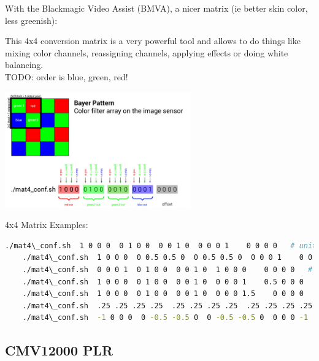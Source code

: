{With the Blackmagic Video Assist (BMVA), a nicer matrix (ie better skin color, less greenish): 


This 4x4 conversion matrix is a very powerful tool and allows to do things like mixing color channels, reassigning channels, applying effects or doing white balancing.\\

TODO: order is blue, green, red! 

\begin{center}
\includegraphics[height=5cm]{images/700px-Mat4-conf-illustration-01}
\end{center}

4x4 Matrix Examples:

\begin{lstlisting}[language=bash,morekeywords=$,keywordstyle=\bfseries,frame=none,xleftmargin=.25in,belowskip=2em, aboveskip=2em]
    ./mat4\_conf.sh  1 0 0 0  0 1 0 0  0 0 1 0  0 0 0 1    0 0 0 0   # unity matrix but not optimal as both green channels are processed separately
    ./mat4\_conf.sh  1 0 0 0  0 0.5 0.5 0  0 0.5 0.5 0  0 0 0 1    0 0 0 0   # the two green channels inside each 2x2 pixel block are averaged and output on both green pixels
    ./mat4\_conf.sh  0 0 0 1  0 1 0 0  0 0 1 0  1 0 0 0    0 0 0 0   # red and blue are swapped
    ./mat4\_conf.sh  1 0 0 0  0 1 0 0  0 0 1 0  0 0 0 1    0.5 0 0 0    # red 50% brigther
    ./mat4\_conf.sh  1 0 0 0  0 1 0 0  0 0 1 0  0 0 0 1.5    0 0 0 0    # blue multiplied with factor 1.5
    ./mat4\_conf.sh  .25 .25 .25 .25  .25 .25 .25 .25  .25 .25 .25 .25  .25 .25 .25 .25    0 0 0 0    # black/white
    ./mat4\_conf.sh  -1 0 0 0  0 -0.5 -0.5 0  0 -0.5 -0.5 0  0 0 0 -1    1 1 1 1    # negative
\end{lstlisting}






\subsection{CMV12000 PLR}

}
